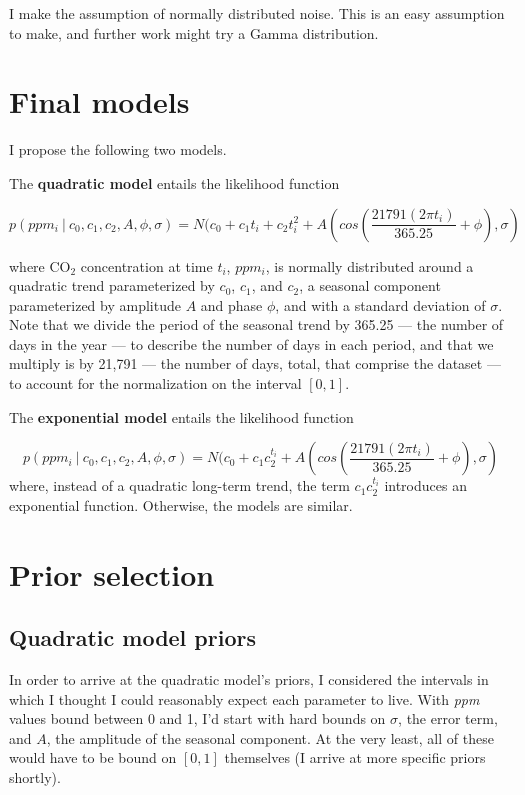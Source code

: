 \documentclass[]{article}
\begin{document}
I make the assumption of normally distributed noise. This is an easy
assumption to make, and further work might try a Gamma distribution.

\hypertarget{final-models}{%
\section{Final models}\label{final-models}}

I propose the following two models. \newline

The \textbf{quadratic model} entails the likelihood function

\[p(ppm_i\ |\ c_0, c_1, c_2, A, \phi, \sigma ) = N(c_0 + c_{1}t_i + c_{2}t_{i}^2 + A(cos(\frac{21791(2\pi t_i)}{365.25} + \phi), \sigma)\]

where CO\(_2\) concentration at time \(t_i\), \(ppm_i\), is normally
distributed around a quadratic trend parameterized by \(c_0\), \(c_1\),
and \(c_2\), a seasonal component parameterized by amplitude \(A\) and
phase \(\phi\), and with a standard deviation of \(\sigma\). Note that
we divide the period of the seasonal trend by 365.25 --- the number of
days in the year --- to describe the number of days in each period, and
that we multiply is by 21,791 --- the number of days, total, that
comprise the dataset --- to account for the normalization on the
interval \([0, 1]\).\newline

The \textbf{exponential model} entails the likelihood function \newline

\[p(ppm_i\ |\ c_0, c_1, c_2, A, \phi, \sigma ) = N(c_0 + c_{1}c_{2}^{t_i} + A(cos(\frac{21791(2\pi t_i)}{365.25} + \phi), \sigma)\]
where, instead of a quadratic long-term trend, the term
\(c_1 c_2^{t_i}\) introduces an exponential function. Otherwise, the
models are similar.

\hypertarget{prior-selection}{%
\section{Prior selection}\label{prior-selection}}

\hypertarget{quadratic-model-priors}{%
\subsection{Quadratic model priors}\label{quadratic-model-priors}}

In order to arrive at the quadratic model's priors, I considered the
intervals in which I thought I could reasonably expect each parameter to
live. With \emph{ppm} values bound between 0 and 1, I'd start with hard
bounds on \(\sigma\), the error term, and \(A\), the amplitude of the
seasonal component. At the very least, all of these would have to be
bound on \([0, 1]\) themselves (I arrive at more specific priors
shortly).\newline
\end{document}
